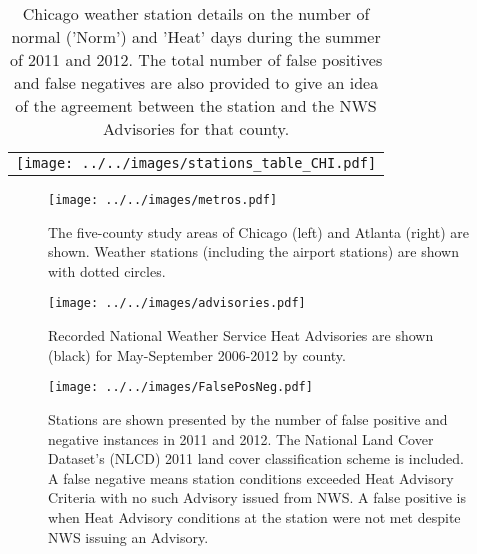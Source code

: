 \documentclass{ametsoc}
\begin{document}
\begin{table}
\caption{Chicago weather station details on the number of normal ('Norm') and 'Heat' days during the summer of 2011 and 2012.  The total number of false positives and false negatives are also provided to give an idea of the agreement between the station and the NWS Advisories for that county.}
\begin{center}
\begin{tabular}{c}
\texttt{[image: ../../images/stations\_table\_CHI.pdf]} 
\end{tabular}
\label{tab:CHIstats}
\end{center}
\end{table}



%

\begin{center}
\begin{figure}[t]
 \texttt{[image: ../../images/metros.pdf]}
  \caption{The five-county study areas of Chicago (left) and Atlanta (right) are shown. Weather stations (including the airport stations) are shown with dotted circles.}
   \label{fig:metros}
\end{figure}
\end{center}


\begin{center}
\begin{figure}[t]
 \texttt{[image: ../../images/advisories.pdf]}
  \caption{Recorded National Weather Service Heat Advisories are shown (black) for May-September 2006-2012 by county.}
   \label{fig:advisories}
\end{figure}
\end{center}

\begin{center}
\begin{figure}[t]
 \texttt{[image: ../../images/FalsePosNeg.pdf]}
  \caption{Stations are shown presented by the number of false positive and negative instances in 2011 and 2012. The National Land Cover Dataset's (NLCD) 2011 land cover classification scheme is included. A false negative means station conditions exceeded Heat Advisory Criteria with no such Advisory issued from NWS. A false positive is when Heat Advisory conditions at the station were not met despite NWS issuing an Advisory.}
   \label{fig:FalsePosNeg}
\end{figure}
\end{center}
\end{document}
